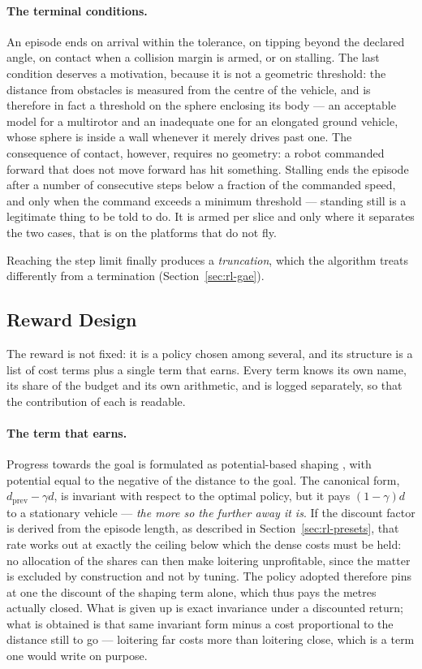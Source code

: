 \paragraph{The terminal conditions.}
An episode ends on arrival within the tolerance, on tipping beyond the declared
angle, on contact when a collision margin is armed, or on stalling. The last
condition deserves a motivation, because it is not a geometric threshold: the
distance from obstacles is measured from the centre of the vehicle, and is
therefore in fact a threshold on the sphere enclosing its body --- an acceptable
model for a multirotor and an inadequate one for an elongated ground vehicle,
whose sphere is inside a wall whenever it merely drives past one. The
consequence of contact, however, requires no geometry: a robot commanded forward
that does not move forward has hit something. Stalling ends the episode after a
number of consecutive steps below a fraction of the commanded speed, and only
when the command exceeds a minimum threshold --- standing still is a legitimate
thing to be told to do. It is armed per slice and only where it separates the
two cases, that is on the platforms that do not fly.

Reaching the step limit finally produces a \emph{truncation}, which the
algorithm treats differently from a termination (Section~\ref{sec:rl-gae}).

\subsection{Reward Design}
\label{sec:rl-reward}

The reward is not fixed: it is a policy chosen among several, and its structure
is a list of cost terms plus a single term that earns. Every term knows its own
name, its share of the budget and its own arithmetic, and is logged separately,
so that the contribution of each is readable.

\paragraph{The term that earns.}
Progress towards the goal is formulated as potential-based shaping
\cite{ng1999policy}, with potential equal to the negative of the distance to the
goal. The canonical form, $d_{\text{prev}} - \gamma d$, is invariant with
respect to the optimal policy, but it pays $(1-\gamma)d$ to a stationary vehicle
--- \emph{the more so the further away it is}. If the discount factor is derived
from the episode length, as described in Section~\ref{sec:rl-presets}, that rate
works out at exactly the ceiling below which the dense costs must be held: no
allocation of the shares can then make loitering unprofitable, since the matter
is excluded by construction and not by tuning. The policy adopted therefore pins
at one the discount of the shaping term alone, which thus pays the metres
actually closed. What is given up is exact invariance under a discounted return;
what is obtained is that same invariant form minus a cost proportional to the
distance still to go --- loitering far costs more than loitering close, which is
a term one would write on purpose.

